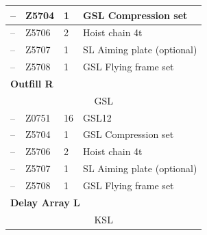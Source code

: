 \begin{longtable}[H]{|llll|}
            \multicolumn{1}{|l|}{--}              & \multicolumn{1}{l|}{Z5704}                  & \multicolumn{1}{l|}{1}              & GSL Compression set        \\ \hline
            \multicolumn{1}{|l|}{--}              & \multicolumn{1}{l|}{Z5706}                  & \multicolumn{1}{l|}{2}              & Hoist chain 4t             \\ \hline
            \multicolumn{1}{|l|}{--}              & \multicolumn{1}{l|}{Z5707}                  & \multicolumn{1}{l|}{1}              & SL Aiming plate (optional) \\ \hline
            \multicolumn{1}{|l|}{--}              & \multicolumn{1}{l|}{Z5708}                  & \multicolumn{1}{l|}{1}              & GSL Flying frame set       \\ \hline
            \multicolumn{4}{|l|}{\textbf{Outfill R}}                                                                                                               \\ \hline
            \multicolumn{4}{|c|}{GSL}                                                                                                                              \\ \hline
            \multicolumn{1}{|l|}{--}              & \multicolumn{1}{l|}{Z0751}                  & \multicolumn{1}{l|}{16}             & GSL12                      \\ \hline
            \multicolumn{1}{|l|}{--}              & \multicolumn{1}{l|}{Z5704}                  & \multicolumn{1}{l|}{1}              & GSL Compression set        \\ \hline
            \multicolumn{1}{|l|}{--}              & \multicolumn{1}{l|}{Z5706}                  & \multicolumn{1}{l|}{2}              & Hoist chain 4t             \\ \hline
            \multicolumn{1}{|l|}{--}              & \multicolumn{1}{l|}{Z5707}                  & \multicolumn{1}{l|}{1}              & SL Aiming plate (optional) \\ \hline
            \multicolumn{1}{|l|}{--}              & \multicolumn{1}{l|}{Z5708}                  & \multicolumn{1}{l|}{1}              & GSL Flying frame set       \\ \hline
            \multicolumn{4}{|l|}{\textbf{Delay Array L}}                                                                                                           \\ \hline
            \multicolumn{4}{|c|}{KSL}                                                                                                                              \\ \hline

\end{longtable}
